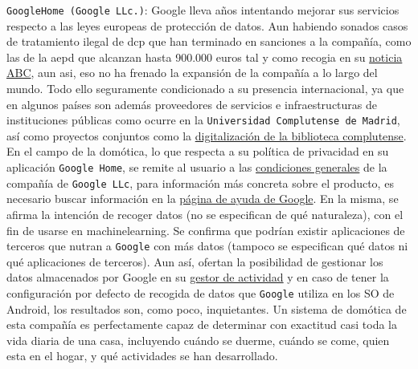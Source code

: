 \verb|GoogleHome (Google LLc.)|: Google lleva años intentando mejorar sus servicios respecto a las leyes europeas de protección de datos. Aun habiendo sonados casos de tratamiento ilegal de \gls{dcp} que han terminado en sanciones a la compañía, como las de la \gls{aepd} que alcanzan hasta 900.000 euros tal y como recogia en su \href{https://www.abc.es/tecnologia/redes/20131219/abci-google-multa-aepd-201312191217.html}{noticia ABC}, aun asi, eso no ha frenado la expansión de la compañía a lo largo del mundo. Todo ello seguramente condicionado a su presencia internacional, ya que en algunos países son además proveedores de servicios e infraestructuras de instituciones públicas como ocurre en la \verb|Universidad Complutense de Madrid|, así como proyectos conjuntos como la \href{https://biblioteca.ucm.es/google8}{digitalización de la biblioteca complutense}. En el campo de la domótica, lo que respecta a su política de privacidad en su aplicación \verb|Google Home|, se remite al usuario a las \href{https://policies.google.com/privacy?hl=es}{condiciones generales} de la compañía de \verb|Google LLc|, para información más concreta sobre el producto, es necesario buscar información en la \href{https://support.google.com/googlehome/answer/7072285?hl=es&ref_topic=7173611}{página de ayuda de Google}. En la misma, se afirma la intención de recoger datos (no se especifican de qué naturaleza), con el fin de usarse en \gls{machinelearning}. Se confirma que podrían existir aplicaciones de terceros que nutran a \verb|Google| con más datos (tampoco se especifican qué datos ni qué aplicaciones de terceros). Aun así, ofertan la posibilidad de gestionar los datos almacenados por Google en su \href{https://myactivity.google.com/}{gestor de actividad} y en caso de tener la configuración por defecto de recogida de datos que \verb|Google| utiliza en los SO de Android, los resultados son, como poco, inquietantes. Un sistema de domótica de esta compañía es perfectamente capaz de determinar con exactitud casi toda la vida diaria de una casa, incluyendo cuándo se duerme, cuándo se come, quien esta en el hogar, y qué actividades se han desarrollado.

\vspace{1cm}

